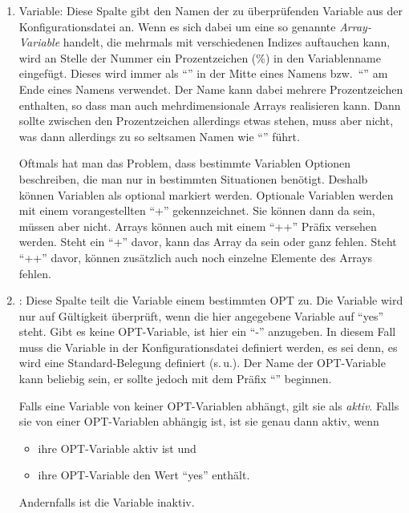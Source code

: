 \begin{enumerate}

\item Variable: Diese Spalte gibt den Namen der zu überprüfenden
  Variable aus der Konfigurationsdatei an. Wenn es sich dabei um eine so
  genannte \emph{Array-Variable} handelt, die mehrmals mit verschiedenen Indizes auftauchen
  kann, wird an Stelle der Nummer ein Prozentzeichen (\%) in den
  Variablenname eingefügt. Dieses wird immer als "`\var{\_\%\_}"' in der Mitte
  eines Namens bzw.\ "`\var{\_\%}"' am Ende eines Namens verwendet. Der Name
  kann dabei mehrere Prozentzeichen
  enthalten, so dass man auch mehrdimensionale Arrays realisieren
  kann. Dann sollte zwischen den Prozentzeichen allerdings etwas
  stehen, muss aber nicht, was dann allerdings zu so seltsamen
  Namen wie "`"' führt.

  Oftmals hat man das Problem, dass bestimmte Variablen Optionen
  beschreiben, die man nur in bestimmten Situationen benötigt. Deshalb
  können Variablen als optional markiert werden. Optionale Variablen
  werden mit einem vorangestellten "`+"' gekennzeichnet. Sie können dann
  da sein, müssen aber nicht. Arrays können auch mit einem "`++"' Präfix
  versehen werden. Steht ein "`+"' davor, kann das Array da sein oder
  ganz fehlen. Steht "`++"' davor, können zusätzlich auch noch einzelne
  Elemente des Arrays fehlen.


\item {}: Diese Spalte teilt die Variable einem bestimmten
  OPT zu. Die Variable wird nur auf Gültigkeit überprüft, wenn die
  hier angegebene Variable auf "`yes"' steht.  Gibt es keine
  OPT-Variable, ist hier ein "`-"' anzugeben. In diesem Fall muss die Variable
  in der Konfigurationsdatei definiert werden, es sei denn, es wird eine
  Standard-Belegung definiert (s.\,u.). Der Name der OPT-Variable kann beliebig
  sein, er sollte jedoch mit dem Präfix "`"' beginnen.

  Falls eine Variable von keiner OPT-Variablen abhängt, gilt sie als
  \emph{aktiv}. Falls sie von einer OPT-Variablen abhängig ist, ist sie genau
  dann aktiv, wenn

  \begin{itemize}
  \item ihre OPT-Variable aktiv ist und
  \item ihre OPT-Variable den Wert "`yes"' enthält.
  \end{itemize}

  Andernfalls ist die Variable inaktiv.


\end{enumerate}

